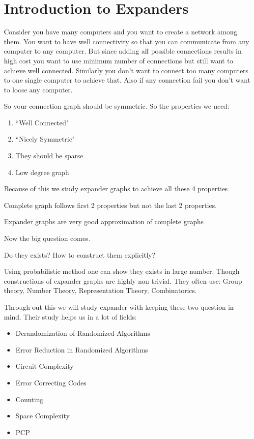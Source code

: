 \chapter{Introduction to Expanders}
Consider you have many computers and you want to create a network among them. You want to have well connectivity so that you can communicate from any computer to any computer. But since adding all possible connections results in high cost you want to use minimum number of connections but still want to achieve well connected. Similarly you don't want to connect too many computers to one single computer to achieve that. Also if any connection fail you don't want to loose any computer.

 So your connection graph should be symmetric. So the properties we need:
\begin{enumerate}
	\item ``Well Connected"
	\item ``Nicely Symmetric"
	\item They should be sparse
	\item Low degree graph
\end{enumerate}
Because of this we study expander graphs to achieve all these 4 properties
\begin{observation*}
	Complete graph follows first 2 properties but not the last 2 properties.
\end{observation*}
\begin{remark}
	Expander graphs are very good approximation of complete graphs
\end{remark}
Now the big question comes.
\begin{question}
	Do they exists? How to construct them explicitly?
\end{question}
Using probabilistic method one can show they exists in large number. Though constructions of expander graphs are highly non trivial. They often use: Group theory, Number Theory, Representation Theory, Combinatorics.


Through out this we will study expander with keeping these two question in mind. Their study helps us in a lot of fields:
\begin{itemize}
	\item Derandomization of Randomized Algorithms
	\item Error Reduction in Randomized Algorithms
	\item Circuit Complexity
	\item Error Correcting Codes
	\item Counting
	\item Space Complexity
	\item PCP
\end{itemize}
\parinf

